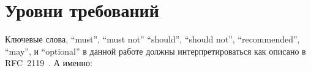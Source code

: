 \chapter{Уровни требований}\vspace{5mm}
\label{requirementchapter}

Ключевые слова, ``must'', ``must not'' ``should'', ``should not'', ``recommended'',
``may'', и ``optional'' в данной работе должны интерпретироваться как описано в RFC~2119~\cite
{mustard}. А именно:\vspace{1mm}

